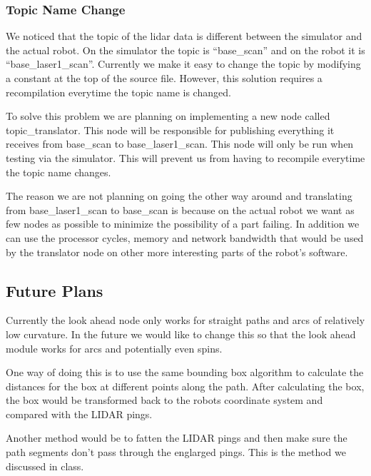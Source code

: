 \subsubsection{Topic Name Change}
We noticed that the topic of the lidar data is different between the
simulator and the actual robot.  On the simulator the topic is
``base\_scan'' and on the robot it is ``base\_laser1\_scan''.  Currently
we make it easy to change the topic by modifying a constant at the top
of the source file.  However, this solution requires a recompilation
everytime the topic name is changed.

To solve this problem we are planning on implementing a new node
called topic\_translator.  This node will be responsible for
publishing everything it receives from base\_scan to
base\_laser1\_scan.  This node will only be run when testing via the
simulator.  This will prevent us from having to recompile everytime
the topic name changes.

The reason we are not planning on going the other way around and
translating from base\_laser1\_scan to base\_scan is because on the
actual robot we want as few nodes as possible to minimize the
possibility of a part failing.  In addition we can use the processor
cycles, memory and network bandwidth that would be used by the translator node on
other more interesting parts of the robot's software.

\subsection{Future Plans}
Currently the look ahead node only works for straight paths and arcs
of relatively low curvature.  In the future we would like to change
this so that the look ahead module works for arcs and potentially even
spins.

One way of doing this is to use the same bounding box algorithm to
calculate the distances for the box at different points along the
path.  After calculating the box, the box would be transformed back to
the robots coordinate system and compared with the LIDAR pings.

Another method would be to fatten the LIDAR pings and then make sure
the path segments don't pass through the englarged pings.  This is the
method we discussed in class.




